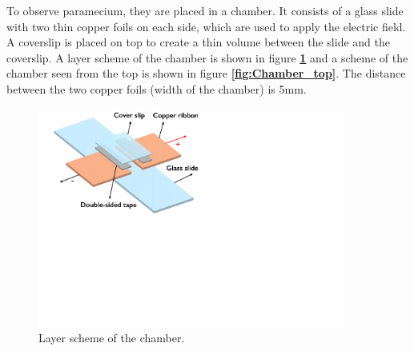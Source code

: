 To observe paramecium, they are placed in a chamber. It consists of a glass slide with two thin copper foils on each side, which are used to apply the electric field. A coverslip is placed on top to create a thin volume between the slide and the coverslip. A layer scheme of the chamber is shown in figure \textbf{\ref{fig:Chamber_layer}} and a scheme of the chamber seen from the top is shown in figure \textbf{\ref{fig:Chamber_top}}. The distance between the two copper foils (width of the chamber) is 5mm. 

\noindent
\begin{minipage}{0.49\textwidth}
    \begin{figure}[H]
    \centering 
    \captionsetup{width=0.9\linewidth, justification=centering}
    \includegraphics[width=0.9\textwidth]{Figures/Chamber_layer.pdf}
    \caption{Layer scheme of the chamber.}
    \label{fig:Chamber_layer}
    \end{figure}
\end{minipage}
\hfill
